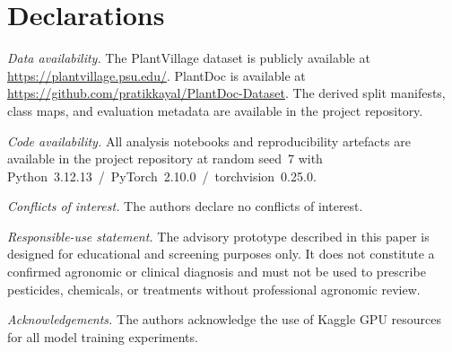 \documentclass[conference]{IEEEtran}
\begin{document}
\section*{Declarations}

\textit{Data availability.}
The PlantVillage dataset is publicly available at
\url{https://plantvillage.psu.edu/}. PlantDoc is available at
\url{https://github.com/pratikkayal/PlantDoc-Dataset}. The derived
split manifests, class maps, and evaluation metadata are available in
the project repository.

\textit{Code availability.}
All analysis notebooks and reproducibility artefacts are available in
the project repository at random seed~7 with
Python~3.12.13~/~PyTorch~2.10.0~/~torchvision~0.25.0.

\textit{Conflicts of interest.}
The authors declare no conflicts of interest.

\textit{Responsible-use statement.}
The advisory prototype described in this paper is designed for
educational and screening purposes only. It does not constitute a
confirmed agronomic or clinical diagnosis and must not be used to
prescribe pesticides, chemicals, or treatments without professional
agronomic review.

\textit{Acknowledgements.}
The authors acknowledge the use of Kaggle GPU resources for all model
training experiments.

\balance



\end{document}
